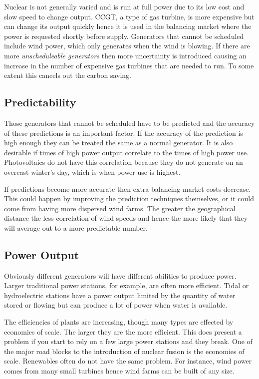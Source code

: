 \documentclass[a4paper,oneside,12pt]{report}
\begin{document}
Nuclear is not generally varied and is run at full power due to its low cost and slow speed to change output. CCGT, a type of gas turbine, is more expensive but can change its output quickly hence it is used in the balancing market where the power is requested shortly before supply. Generators that cannot be scheduled include wind power, which only generates when the wind is blowing. If there are more \emph{unscheduleable generators} then more uncertainty is introduced causing an increase in the number of expensive gas turbines that are needed to run. To some extent this cancels out the carbon saving.

\subsection{Predictability}

Those generators that cannot be scheduled have to be predicted and the accuracy of these predictions is an important factor. If the accuracy of the prediction is high enough they can be treated the same as a normal generator. It is also desirable if times of high power output correlate to the times of high power use. Photovoltaics do not have this correlation because they do not generate on an overcast winter's day, which is when power use is highest.

If predictions become more accurate then extra balancing market costs decrease. This could happen by improving the prediction techniques themselves, or it could come from having more dispersed wind farms. The greater the geographical distance the less correlation of wind speeds and hence the more likely that they will average out to a more predictable number.

\subsection{Power Output}

Obviously different generators will have different abilities to produce power. Larger traditional power stations, for example, are often more efficient. Tidal or hydroelectric stations have a power output limited by the quantity of water stored or flowing but can produce a lot of power when water is available.

The efficiencies of plants are increasing, though many types are effected by economies of scale. The larger they are the more efficient. This does present a problem if you start to rely on a few large power stations and they break. One of the major road blocks to the introduction of nuclear fusion is the economies of scale. Renewables often do not have the same problem. For instance, wind power comes from many small turbines hence wind farms can be built of any size.
\end{document}

